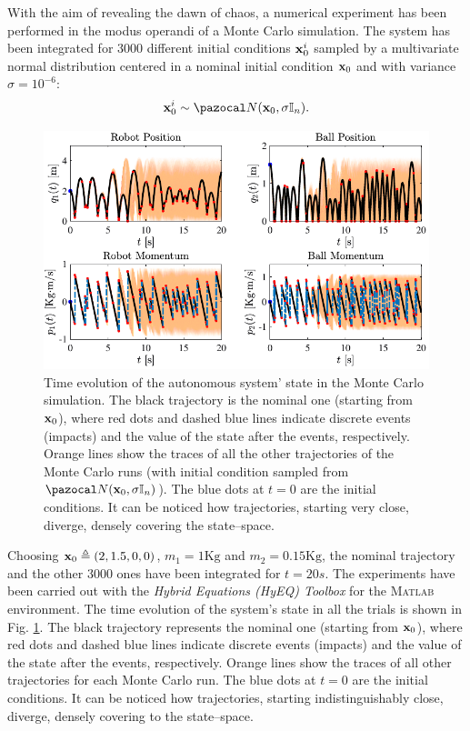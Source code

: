 With the aim of revealing the dawn of chaos, a numerical experiment has been performed in the modus operandi of a Monte Carlo simulation. The system has been integrated for 3000 different initial conditions $\mathbf{x}_0^i$ sampled by a multivariate normal distribution centered in a nominal initial condition $\mathbf{x}_0$ and with variance $\sigma = 10^{-6}$:
%
\begin{equation}
\xb_0^i \sim \N(\xb_0,\sigma\mathbb{I}_n).
\end{equation}
%
\begin{figure}[t!]
	\centering
	\includegraphics[width = \linewidth]{Figures/chaos1.pdf}
	\caption[Time evolution of the autonomous system' state in the Monte Carlo simulation]{Time evolution of the autonomous system' state in the Monte Carlo simulation. The black trajectory is the nominal one (starting from $\mathbf{x}_0$), where red dots and dashed blue lines indicate discrete events (impacts) and the value of the state after the events, respectively. Orange lines show the traces of all the other trajectories of the Monte Carlo runs (with initial condition sampled from $\N(\xb_0,\sigma\mathbb{I}_n)$). The blue dots at $t=0$ are the initial conditions. It can be noticed how trajectories, starting very close, diverge, densely covering the state--space.}
	\label{fig:chaos1}
\end{figure}
Choosing $\mathbf{x}_0\triangleq(2,1.5,0,0)$, $m_1 = 1\text{Kg}$ and $m_2 = 0.15\text{Kg}$, the nominal trajectory and the other 3000 ones have been integrated for $t = 20s$. The experiments have been carried out with the \textit{Hybrid Equations (HyEQ) Toolbox} \citep{sanfelice2013toolbox} for the \textsc{Matlab} environment. The time evolution of the system's state in all the trials is shown in Fig. \ref{fig:chaos1}. The black trajectory represents the nominal one (starting from $\mathbf{x}_0$), where red dots and dashed blue lines indicate discrete events (impacts) and the value of the state after the events, respectively. Orange lines show the traces of all other trajectories for each Monte Carlo run. The blue dots at $t=0$ are the initial conditions. It can be noticed how trajectories, starting indistinguishably close, diverge, densely covering to the state--space.
%

